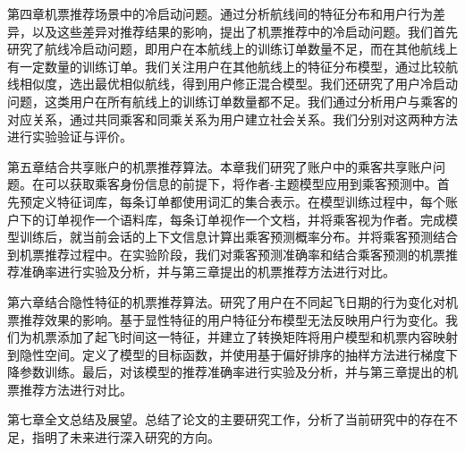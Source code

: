 第四章机票推荐场景中的冷启动问题。通过分析航线间的特征分布和用户行为差异，以及这些差异对推荐结果的影响，提出了机票推荐中的冷启动问题。我们首先研究了航线冷启动问题，即用户在本航线上的训练订单数量不足，而在其他航线上有一定数量的训练订单。我们关注用户在其他航线上的特征分布模型，通过比较航线相似度，选出最优相似航线，得到用户修正混合模型。我们还研究了用户冷启动问题，这类用户在所有航线上的训练订单数量都不足。我们通过分析用户与乘客的对应关系，通过共同乘客和同乘关系为用户建立社会关系。我们分别对这两种方法进行实验验证与评价。

第五章结合共享账户的机票推荐算法。本章我们研究了账户中的乘客共享账户问题。在可以获取乘客身份信息的前提下，将作者-主题模型应用到乘客预测中。首先预定义特征词库，每条订单都使用词汇的集合表示。在模型训练过程中，每个账户下的订单视作一个语料库，每条订单视作一个文档，并将乘客视为作者。完成模型训练后，就当前会话的上下文信息计算出乘客预测概率分布。并将乘客预测结合到机票推荐过程中。在实验阶段，我们对乘客预测准确率和结合乘客预测的机票推荐准确率进行实验及分析，并与第三章提出的机票推荐方法进行对比。

第六章结合隐性特征的机票推荐算法。研究了用户在不同起飞日期的行为变化对机票推荐效果的影响。基于显性特征的用户特征分布模型无法反映用户行为变化。我们为机票添加了起飞时间这一特征，并建立了转换矩阵将用户模型和机票内容映射到隐性空间。定义了模型的目标函数，并使用基于偏好排序的抽样方法进行梯度下降参数训练。最后，对该模型的推荐准确率进行实验及分析，并与第三章提出的机票推荐方法进行对比。

第七章全文总结及展望。总结了论文的主要研究工作，分析了当前研究中的存在不足，指明了未来进行深入研究的方向。